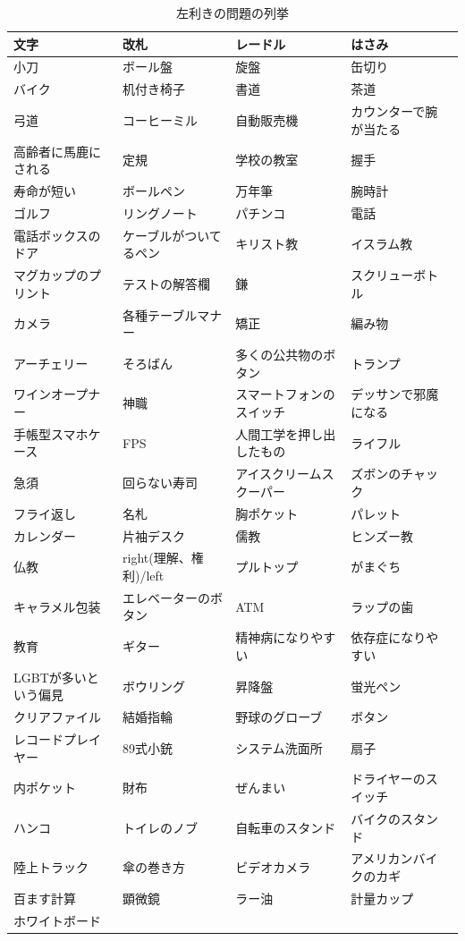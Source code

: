 \documentclass{jsarticle}
\begin{document}
\begin{table}[H]
  \begin{tabular}{|l|l|l|l|l|}\hline
  文字 & 改札 &  レードル &  はさみ \\ \hline
  小刀 &ボール盤 &  旋盤 &  缶切り \\\hline
  バイク &  机付き椅子 &  書道 &  茶道\\\hline
  弓道 &  コーヒーミル &  自動販売機 &  カウンターで腕が当たる\\\hline
  高齢者に馬鹿にされる &  定規 &  学校の教室 &  握手 \\\hline
  寿命が短い &  ボールペン &  万年筆 &  腕時計\\\hline
  ゴルフ &  リングノート &  パチンコ &  電話 \\\hline
  電話ボックスのドア &  ケーブルがついてるペン &  キリスト教 &  イスラム教 \\\hline
  マグカップのプリント &  テストの解答欄 &  鎌 &スクリューボトル \\\hline
  カメラ &  各種テーブルマナー &  矯正 &  編み物 \\\hline
  アーチェリー &  そろばん &  多くの公共物のボタン &  トランプ \\\hline
  ワインオープナー &  神職 &  スマートフォンのスイッチ &  デッサンで邪魔になる \\\hline
  手帳型スマホケース &  FPS &  人間工学を押し出したもの &  ライフル \\\hline
  急須 &  回らない寿司 &  アイスクリームスクーパー &  ズボンのチャック\\\hline
  フライ返し &  名札 &  胸ポケット &  パレット \\\hline
  カレンダー &  片袖デスク &  儒教 &  ヒンズー教 \\\hline
  仏教 &  right(理解、権利)/left &  プルトップ &  がまぐち \\\hline
  キャラメル包装 &  エレベーターのボタン &  ATM &  ラップの歯 \\\hline
  教育 &  ギター &  精神病になりやすい &  依存症になりやすい \\\hline
  LGBTが多いという偏見 &  ボウリング &  昇降盤 &  蛍光ペン \\\hline
  クリアファイル &  結婚指輪 &  野球のグローブ &  ボタン \\\hline
  レコードプレイヤー & 89式小銃 &  システム洗面所 &  扇子 \\\hline
  内ポケット &  財布 &  ぜんまい &  ドライヤーのスイッチ \\\hline
   ハンコ &  トイレのノブ &  自転車のスタンド &バイクのスタンド \\\hline
  陸上トラック&  傘の巻き方 &  ビデオカメラ &  アメリカンバイクのカギ \\\hline
  百ます計算 &  顕微鏡 &  ラー油 &  計量カップ \\\hline
  ホワイトボード　& & &\\ \hline
\end{tabular}
\caption{左利きの問題の列挙}
\end{table}
\end{document}
